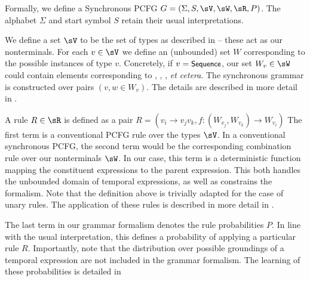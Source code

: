 Formally, we define a Synchronous PCFG 
	$G = \left(\Sigma,S,\sV,\sW,\sR,P\right)$.
The alphabet $\Sigma$ and start symbol $S$ retain their usual interpretations.

We define a set $\sV$ to be the set of types as described in
	 -- these act as our nonterminals.
For each $v \in \sV$ we define an (unbounded) set $W$ corresponding to the 
	possible instances of type $v$.
Concretely, if $v=\textsf{\small{Sequence}}$, our set $W_v \in \sW$ could contain elements
	corresponding to , , ,
	\textit{et cetera}.
The synchronous grammar is constructed over pairs $(v,w \in W_v)$.
The details are described in more detail in .

A rule $R \in \sR$ is defined as a pair 
	$R = \left(v_i \rightarrow v_jv_k, 
		f : (W_{v_j},W_{v_k}) \rightarrow W_{v_i}\right)$
The first term is a conventional PCFG rule over the types
	$\sV$.
In a conventional synchronous PCFG, the second term would be the corresponding
	combination rule over our nonterminals $\sW$.
In our case, this term is a deterministic function mapping the
	constituent expressions to the parent expression.
This both handles the unbounded domain of temporal expressions,
	as well as constrains the formalism.
Note that the definition above is trivially adapted for the case of unary
	rules.
The application of these rules is described in more detail in 
	.

The last term in our grammar formalism denotes the rule probabilities $P$.
In line with the usual interpretation, this defines a probability
	of applying a particular rule $R$.
Importantly, note that the distribution over possible groundings
	of a temporal expression are not included in the grammar
	formalism.
The learning of these probabilities is detailed in 



